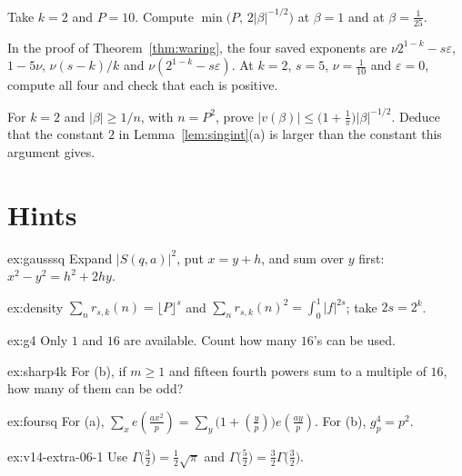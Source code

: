 \begin{exercise}[$\star$]\label{ex:v14-extra-06-2}
Take $k=2$ and $P=10$. Compute $\min\bigl(P,\,2|\beta|^{-1/2}\bigr)$ at $\beta=1$ and at $\beta=\frac1{25}$.
\end{exercise}

\begin{exercise}[$\star$]\label{ex:v14-extra-06-3}
In the proof of Theorem~\ref{thm:waring}, the four saved exponents are $\nu 2^{1-k}-s\varepsilon$, $1-5\nu$, $\nu(s-k)/k$ and $\nu(2^{1-k}-s\varepsilon)$. At $k=2$, $s=5$, $\nu=\frac1{10}$ and $\varepsilon=0$, compute all four and check that each is positive.
\end{exercise}

\begin{exercise}[$\star\star\star$]\label{ex:v14-extra-06-4}
For $k=2$ and $|\beta|\ge1/n$, with $n=P^2$, prove $|v(\beta)|\le\bigl(1+\frac1\pi\bigr)|\beta|^{-1/2}$. Deduce that the constant $2$ in Lemma~\ref{lem:singint}(a) is larger than the constant this argument gives.
\end{exercise}

\section{Hints}

\begin{hint}{ex:gausssq}
Expand $|S(q,a)|^2$, put $x=y+h$, and sum over $y$ first: $x^2-y^2=h^2+2hy$.
\end{hint}
\begin{hint}{ex:density}
$\sum_nr_{s,k}(n)=\lfloor P\rfloor^s$ and $\sum_nr_{s,k}(n)^2=\int_0^1|f|^{2s}$; take $2s=2^k$.
\end{hint}
\begin{hint}{ex:g4}
Only $1$ and $16$ are available. Count how many $16$'s can be used.
\end{hint}
\begin{hint}{ex:sharp4k}
For (b), if $m\ge1$ and fifteen fourth powers sum to a multiple of $16$, how many of them can be odd?
\end{hint}
\begin{hint}{ex:foursq}
For (a), $\sum_xe(\frac{ax^2}p)=\sum_y\bigl(1+(\frac yp)\bigr)e(\frac{ay}p)$. For (b), $g_p^4=p^2$.
\end{hint}
\begin{hint}{ex:v14-extra-06-1}
Use $\Gamma\bigl(\frac32\bigr)=\frac12\sqrt\pi$ and $\Gamma\bigl(\frac52\bigr)=\frac32\Gamma\bigl(\frac32\bigr)$.
\end{hint}

